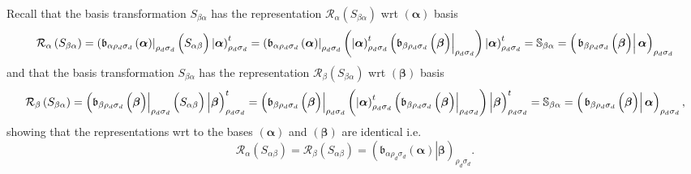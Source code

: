 \documentclass[aps,preprint]{revtex4}
\begin{document}
Recall that the basis transformation $S_{\beta \alpha }$ has the
representation $\mathcal{R}_{\alpha }\left( S_{\beta \alpha }\right) $ wrt $%
\left( \boldsymbol{\alpha }\right) $ basis 
\begin{equation}
\mathcal{R}_{\alpha }\left( S_{\beta \alpha }\right) =\left( \mathfrak{b}%
_{\alpha \rho _{d}\sigma _{d}}\left( \overset{}{\boldsymbol{\alpha }}\right)
\right\vert _{\rho _{d}\sigma _{d}}\left( \overset{}{S_{\alpha \beta }}%
\right) \left\vert \overset{}{\boldsymbol{\alpha }}\right) _{\rho _{d}\sigma
_{d}}^{t}=\left( \mathfrak{b}_{\alpha \rho _{d}\sigma _{d}}\left( \overset{}{%
\boldsymbol{\alpha }}\right) \right\vert _{\rho _{d}\sigma _{d}}\left( 
\overset{}{\left\vert \overset{}{\boldsymbol{\alpha }}\right) _{\rho
_{d}\sigma _{d}}^{t}\left( \mathfrak{b}_{\beta \rho _{d}\sigma _{d}}\left( 
\overset{}{\boldsymbol{\beta }}\right) \right\vert _{\rho _{d}\sigma _{d}}}%
\right) \left\vert \overset{}{\boldsymbol{\alpha }}\right) _{\rho _{d}\sigma
_{d}}^{t}=\mathbb{S}_{\beta \alpha }=\left( \left. \mathfrak{b}_{\beta \rho
_{d}\sigma _{d}}\left( \overset{}{\boldsymbol{\beta }}\right) \right\vert 
\overset{}{\boldsymbol{\alpha }}\right) _{\rho _{d}\sigma _{d}}
\end{equation}%
and that the basis transformation $S_{\beta \alpha }$ has the representation 
$\mathcal{R}_{\beta }\left( S_{\beta \alpha }\right) $ wrt $\left( 
\boldsymbol{\beta }\right) $ basis 
\begin{equation}
\mathcal{R}_{\beta }\left( S_{\beta \alpha }\right) =\left( \mathfrak{b}%
_{\beta \rho _{d}\sigma _{d}}\left( \overset{}{\boldsymbol{\beta }}\right)
\right\vert _{\rho _{d}\sigma _{d}}\left( \overset{}{S_{\alpha \beta }}%
\right) \left\vert \overset{}{\boldsymbol{\beta }}\right) _{\rho _{d}\sigma
_{d}}^{t}=\left( \mathfrak{b}_{\beta \rho _{d}\sigma _{d}}\left( \overset{}{%
\boldsymbol{\beta }}\right) \right\vert _{\rho _{d}\sigma _{d}}\left( 
\overset{}{\left\vert \overset{}{\boldsymbol{\alpha }}\right) _{\rho
_{d}\sigma _{d}}^{t}\left( \mathfrak{b}_{\beta \rho _{d}\sigma _{d}}\left( 
\overset{}{\boldsymbol{\beta }}\right) \right\vert _{\rho _{d}\sigma _{d}}}%
\right) \left\vert \overset{}{\boldsymbol{\beta }}\right) _{\rho _{d}\sigma
_{d}}^{t}=\mathbb{S}_{\beta \alpha }=\left( \left. \mathfrak{b}_{\beta \rho
_{d}\sigma _{d}}\left( \overset{}{\boldsymbol{\beta }}\right) \right\vert 
\overset{}{\boldsymbol{\alpha }}\right) _{\rho _{d}\sigma _{d}},
\end{equation}%
showing that the representations wrt to the bases $\left( \boldsymbol{\alpha 
}\right) $ and $\left( \boldsymbol{\beta }\right) $ are identical i.e. 
\begin{equation}
\mathcal{R}_{\alpha }\left( S_{\alpha \beta }\right) =\mathcal{R}_{\beta
}\left( S_{\alpha \beta }\right) =\left( \left. \mathfrak{b}_{\alpha \rho
_{d}\sigma _{d}}\left( \overset{}{\boldsymbol{\alpha }}\right) \right\vert 
\overset{}{\boldsymbol{\beta }}\right) _{\rho _{d}\sigma _{d}}.
\end{equation}
\end{document}
